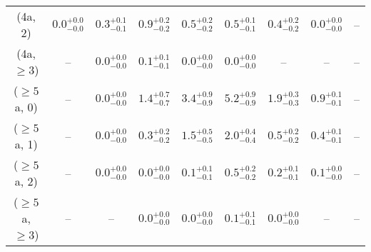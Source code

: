 \begin{table}[h!]
{\begin{tabular}{ccccccccc}
	(4a, 2) & $0.0^{+ 0.0 }_{- 0.0 }$ & $0.3^{+ 0.1 }_{- 0.1 }$ & $0.9^{+ 0.2 }_{- 0.2 }$ & $0.5^{+ 0.2 }_{- 0.2 }$ & $0.5^{+ 0.1 }_{- 0.1 }$ & $0.4^{+ 0.2 }_{- 0.2 }$ & $0.0^{+ 0.0 }_{- 0.0 }$ & -- \\[0.5ex] 
	(4a, $\ge3$) & -- & $0.0^{+ 0.0 }_{- 0.0 }$ & $0.1^{+ 0.1 }_{- 0.1 }$ & $0.0^{+ 0.0 }_{- 0.0 }$ & $0.0^{+ 0.0 }_{- 0.0 }$ & -- & -- & -- \\[0.5ex] 
	($\ge5$a, 0) & -- & $0.0^{+ 0.0 }_{- 0.0 }$ & $1.4^{+ 0.7 }_{- 0.7 }$ & $3.4^{+ 0.9 }_{- 0.9 }$ & $5.2^{+ 0.9 }_{- 0.9 }$ & $1.9^{+ 0.3 }_{- 0.3 }$ & $0.9^{+ 0.1 }_{- 0.1 }$ & -- \\[0.5ex] 
	($\ge5$a, 1) & -- & $0.0^{+ 0.0 }_{- 0.0 }$ & $0.3^{+ 0.2 }_{- 0.2 }$ & $1.5^{+ 0.5 }_{- 0.5 }$ & $2.0^{+ 0.4 }_{- 0.4 }$ & $0.5^{+ 0.2 }_{- 0.2 }$ & $0.4^{+ 0.1 }_{- 0.1 }$ & -- \\[0.5ex] 
	($\ge5$a, 2) & -- & $0.0^{+ 0.0 }_{- 0.0 }$ & $0.0^{+ 0.0 }_{- 0.0 }$ & $0.1^{+ 0.1 }_{- 0.1 }$ & $0.5^{+ 0.2 }_{- 0.2 }$ & $0.2^{+ 0.1 }_{- 0.1 }$ & $0.1^{+ 0.0 }_{- 0.0 }$ & -- \\[0.5ex] 
	($\ge5$a, $\ge3$) & -- & -- & $0.0^{+ 0.0 }_{- 0.0 }$ & $0.0^{+ 0.0 }_{- 0.0 }$ & $0.1^{+ 0.1 }_{- 0.1 }$ & $0.0^{+ 0.0 }_{- 0.0 }$ & -- & -- \\[0.5ex] 
	\hline
	\hline
\end{tabular}}
\end{table}
